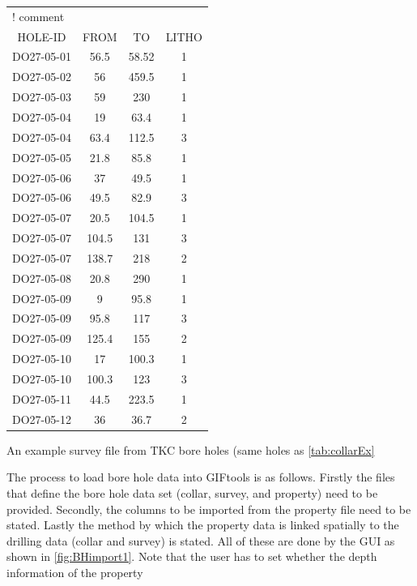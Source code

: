 \begin{fileExample}
\begin{tabular}{|cccc|}
\hline
\multicolumn{4}{|l|}{! comment} \\
HOLE-ID & FROM & TO & LITHO  \\
DO27-05-01 & 56.5 & 58.52 & 1 \\
DO27-05-02 & 56 & 459.5 & 1 \\
DO27-05-03 & 59 & 230 & 1 \\
DO27-05-04 & 19 & 63.4 & 1 \\
DO27-05-04 & 63.4 & 112.5 & 3 \\
DO27-05-05 & 21.8 & 85.8 & 1 \\
DO27-05-06 & 37 & 49.5 & 1 \\
DO27-05-06 & 49.5 & 82.9 & 3 \\
DO27-05-07 & 20.5 & 104.5 & 1 \\
DO27-05-07 & 104.5 & 131 & 3 \\
DO27-05-07 & 138.7 & 218 & 2 \\
DO27-05-08 & 20.8 & 290 & 1 \\
DO27-05-09 & 9 & 95.8 & 1 \\
DO27-05-09 & 95.8 & 117 & 3 \\
DO27-05-09 & 125.4 & 155 & 2 \\
DO27-05-10 & 17 & 100.3 & 1 \\
DO27-05-10 & 100.3 & 123 & 3 \\
DO27-05-11 & 44.5 & 223.5 & 1 \\
DO27-05-12 & 36 & 36.7 & 2 \\
\hline
\end{tabular}
\caption{An example survey file from TKC bore holes (same holes as \autoref{tab:collarEx}}
\label{tab:propEx}
\end{fileExample}

 The process to load bore hole data into GIFtools is as follows. Firstly the files that define the bore hole data set (collar, survey, and property) need to be provided. Secondly, the columns to be imported from the property file need to be stated. Lastly the method by which the property data is linked spatially to the drilling data (collar and survey) is stated. All of these are done by the GUI as shown in \autoref{fig:BHimport1}. Note that the user has to set whether the depth information of the property 

